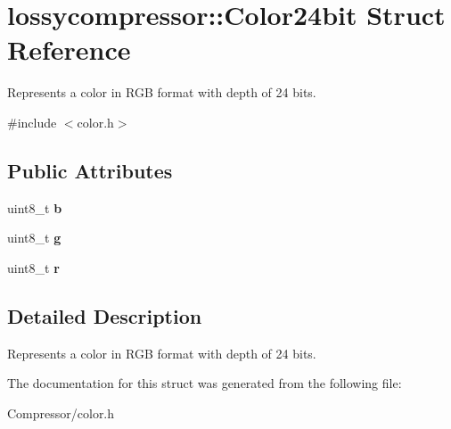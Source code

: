 \hypertarget{structlossycompressor_1_1_color24bit}{}\section{lossycompressor\+:\+:Color24bit Struct Reference}
\label{structlossycompressor_1_1_color24bit}


Represents a color in R\+GB format with depth of 24 bits.  




{\ttfamily \#include $<$color.\+h$>$}

\subsection*{Public Attributes}
\begin{DoxyCompactItemize}
\item 
uint8\+\_\+t {\bfseries b}\hypertarget{structlossycompressor_1_1_color24bit_ad3729fdc98880784cb4b1880683f3fb1}{}\label{structlossycompressor_1_1_color24bit_ad3729fdc98880784cb4b1880683f3fb1}

\item 
uint8\+\_\+t {\bfseries g}\hypertarget{structlossycompressor_1_1_color24bit_a850c7d28e7ca74de1df3283c584c0f3f}{}\label{structlossycompressor_1_1_color24bit_a850c7d28e7ca74de1df3283c584c0f3f}

\item 
uint8\+\_\+t {\bfseries r}\hypertarget{structlossycompressor_1_1_color24bit_a2ec983ebeae789be926c4e95484f20ca}{}\label{structlossycompressor_1_1_color24bit_a2ec983ebeae789be926c4e95484f20ca}

\end{DoxyCompactItemize}


\subsection{Detailed Description}
Represents a color in R\+GB format with depth of 24 bits. 

The documentation for this struct was generated from the following file\+:\begin{DoxyCompactItemize}
\item 
Compressor/color.\+h\end{DoxyCompactItemize}
